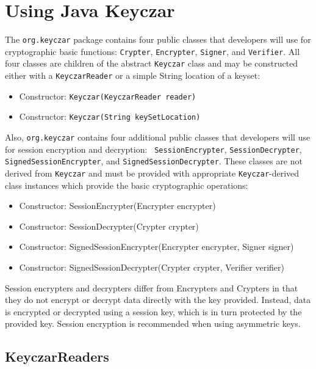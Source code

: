 \documentclass{llncs}
\begin{document}
\section{Using Java Keyczar}

The {\tt org.keyczar} package contains four public classes that
developers will use for cryptographic basic functions: {\tt Crypter},
{\tt Encrypter}, {\tt Signer}, and {\tt Verifier}. All four classes
are children of the abstract {\tt Keyczar} class and may be
constructed either with a {\tt KeyczarReader} or a simple String
location of a keyset:


\begin{itemize}
  \item Constructor: {\tt Keyczar(KeyczarReader reader)}
  \item Constructor: {\tt Keyczar(String keySetLocation)}
\end{itemize}

Also, {\tt org.keyczar} contains four additional public classes that
developers will use for session encryption and decryption: {\tt
SessionEncrypter}, {\tt SessionDecrypter}, {\tt
  SignedSessionEncrypter}, and {\tt SignedSessionDecrypter}.  These
classes are not derived from {\tt Keyczar} and must be provided with
appropriate {\tt Keyczar}-derived class instances which provide the
basic cryptographic operations:

\begin{itemize}
  \item Constructor: SessionEncrypter(Encrypter encrypter)
  \item Constructor: SessionDecrypter(Crypter crypter)
  \item Constructor: SignedSessionEncrypter(Encrypter encrypter,
    Signer signer)
  \item Constructor: SignedSessionDecrypter(Crypter crypter,
    Verifier verifier)
\end{itemize}

Session encrypters and decrypters differ from Encrypters and Crypters
in that they do not encrypt or decrypt data directly with the key
provided.  Instead, data is encrypted or decrypted using a session
key, which is in turn protected by the provided key.  Session
encryption is recommended when using asymmetric keys.

\subsection{KeyczarReaders}
\end{document}
